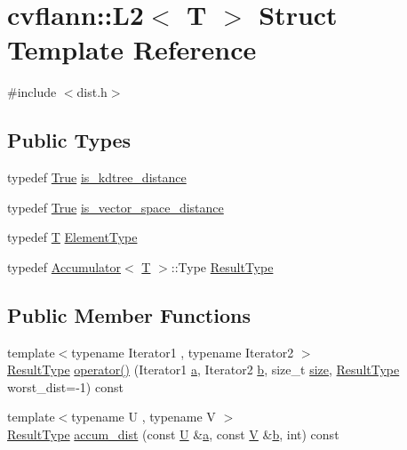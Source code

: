 \hypertarget{structcvflann_1_1L2}{\section{cvflann\-:\-:L2$<$ T $>$ Struct Template Reference}
\label{structcvflann_1_1L2}
}


{\ttfamily \#include $<$dist.\-h$>$}

\subsection*{Public Types}
\begin{DoxyCompactItemize}
\item 
typedef \hyperlink{classcvflann_1_1True}{True} \hyperlink{structcvflann_1_1L2_a3da7a47efd79776d2eff26fcd3b6d3b1}{is\-\_\-kdtree\-\_\-distance}
\item 
typedef \hyperlink{classcvflann_1_1True}{True} \hyperlink{structcvflann_1_1L2_aaab92e6462f69adb45b3822b922a232d}{is\-\_\-vector\-\_\-space\-\_\-distance}
\item 
typedef \hyperlink{calib3d_8hpp_a3efb9551a871ddd0463079a808916717}{T} \hyperlink{structcvflann_1_1L2_a947248fbf703551189651b69d75435db}{Element\-Type}
\item 
typedef \hyperlink{structcvflann_1_1Accumulator}{Accumulator}$<$ \hyperlink{calib3d_8hpp_a3efb9551a871ddd0463079a808916717}{T} $>$\-::Type \hyperlink{structcvflann_1_1L2_a725e8728f510569bbdf7a14656be074f}{Result\-Type}
\end{DoxyCompactItemize}
\subsection*{Public Member Functions}
\begin{DoxyCompactItemize}
\item 
{\footnotesize template$<$typename Iterator1 , typename Iterator2 $>$ }\\\hyperlink{structcvflann_1_1L2_a725e8728f510569bbdf7a14656be074f}{Result\-Type} \hyperlink{structcvflann_1_1L2_a5ae2dfa1a8482219801f7f2c8d1811f2}{operator()} (Iterator1 \hyperlink{legacy_8hpp_a1031d0e0a97a340abfe0a6ab9e831045}{a}, Iterator2 \hyperlink{legacy_8hpp_ac04272e8ca865b8fba18d36edae9fd2a}{b}, size\-\_\-t \hyperlink{legacy_8hpp_ae97003f8d5c64cdfb99f6f2606d121b6}{size}, \hyperlink{structcvflann_1_1L2_a725e8728f510569bbdf7a14656be074f}{Result\-Type} worst\-\_\-dist=-\/1) const 
\item 
{\footnotesize template$<$typename U , typename V $>$ }\\\hyperlink{structcvflann_1_1L2_a725e8728f510569bbdf7a14656be074f}{Result\-Type} \hyperlink{structcvflann_1_1L2_a41c76ac6d835169ea3619e16ff25f4ab}{accum\-\_\-dist} (const \hyperlink{core__c_8h_aa9c521f41af9a5191e5e4b6ffbae211a}{U} \&\hyperlink{legacy_8hpp_a1031d0e0a97a340abfe0a6ab9e831045}{a}, const \hyperlink{core__c_8h_ad8dd4fff0e3910932187b6de0543cae1}{V} \&\hyperlink{legacy_8hpp_ac04272e8ca865b8fba18d36edae9fd2a}{b}, int) const 
\end{DoxyCompactItemize}


